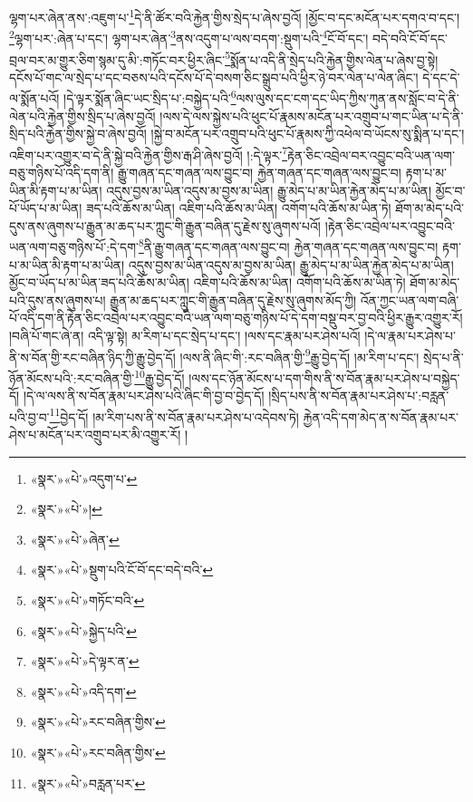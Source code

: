 ལྷག་པར་ཞེན་ནས་:འཇུག་པ་\footnote{«སྣར་»«པེ་»འདུག་པ་}དེ་ནི་ཚོར་བའི་རྐྱེན་གྱིས་སྲེད་པ་ཞེས་བྱའོ། །མྱོང་བ་དང་མངོན་པར་དགའ་བ་དང་། \footnote{«སྣར་»«པེ་»།  }ལྷག་པར་:ཞེན་པ་དང་། ལྷག་པར་ཞེན་\footnote{«སྣར་»«པེ་»ཞེན་}ནས་འདུག་པ་ལས་བདག་:སྡུག་པའི་\footnote{«སྣར་»«པེ་»སྡུག་པའི་ངོ་བོ་དང་བདེ་བའི་}ངོ་བོ་དང་། བདེ་བའི་ངོ་བོ་དང་བྲལ་བར་མ་གྱུར་ཅིག་སྙམ་དུ་མི་:གཏོང་བར་ཕྱིར་ཞིང་\footnote{«སྣར་»«པེ་»གཏོང་བའི་}སྨོན་པ་འདི་ནི་སྲེད་པའི་རྐྱེན་གྱིས་ལེན་པ་ཞེས་བྱ་སྟེ། དངོས་པོ་གང་ལ་སྲེད་པ་དང་བཅས་པའི་དངོས་པོ་དེ་བསག་ཅིང་སྒྲུབ་པའི་ཕྱིར་ཉེ་བར་ལེན་པ་ལེན་ཞིང་། དེ་དང་དེ་ལ་སྨོན་པའོ། །དེ་ལྟར་སྨོན་ཞིང་ཡང་སྲིད་པ་:བསྐྱེད་པའི་\footnote{«སྣར་»«པེ་»སྐྱེད་པའི་}ལས་ལུས་དང་ངག་དང་ཡིད་ཀྱིས་ཀུན་ནས་སློང་བ་དེ་ནི་ལེན་པའི་རྐྱེན་གྱིས་སྲིད་པ་ཞེས་བྱའོ། །ལས་དེ་ལས་སྐྱེས་པའི་ཕུང་པོ་རྣམས་མངོན་པར་འགྲུབ་པ་གང་ཡིན་པ་དེ་ནི་སྲིད་པའི་རྐྱེན་གྱིས་སྐྱེ་བ་ཞེས་བྱའོ། །སྐྱེ་བ་མངོན་པར་འགྲུབ་པའི་ཕུང་པོ་རྣམས་ཀྱི་འཕེལ་བ་ཡོངས་སུ་སྨིན་པ་དང་། འཇིག་པར་འགྱུར་བ་དེ་ནི་སྐྱེ་བའི་རྐྱེན་གྱིས་རྒ་ཤི་ཞེས་བྱའོ། །:དེ་ལྟར་\footnote{«སྣར་»«པེ་»དེ་ལྟར་ན་}རྟེན་ཅིང་འབྲེལ་བར་འབྱུང་བའི་ཡན་ལག་བཅུ་གཉིས་པོ་འདི་དག་ནི། རྒྱུ་གཞན་དང་གཞན་ལས་བྱུང་བ། རྐྱེན་གཞན་དང་གཞན་ལས་བྱུང་བ། རྟག་པ་མ་ཡིན་མི་རྟག་པ་མ་ཡིན། འདུས་བྱས་མ་ཡིན་འདུས་མ་བྱས་མ་ཡིན། རྒྱུ་མེད་པ་མ་ཡིན་རྐྱེན་མེད་པ་མ་ཡིན། མྱོང་བ་པོ་ཡོད་པ་མ་ཡིན། ཟད་པའི་ཆོས་མ་ཡིན། འཇིག་པའི་ཆོས་མ་ཡིན། འགོག་པའི་ཆོས་མ་ཡིན་ཏེ། ཐོག་མ་མེད་པའི་དུས་ནས་ཞུགས་པ་རྒྱུན་མ་ཆད་པར་ཀླུང་གི་རྒྱུན་བཞིན་དུ་རྗེས་སུ་ཞུགས་པའོ། །རྟེན་ཅིང་འབྲེལ་པར་འབྱུང་བའི་ཡན་ལག་བཅུ་གཉིས་པོ་:དེ་དག་\footnote{«སྣར་»«པེ་»འདི་དག་}ནི་རྒྱུ་གཞན་དང་གཞན་ལས་བྱུང་བ། རྐྱེན་གཞན་དང་གཞན་ལས་བྱུང་བ། རྟག་པ་མ་ཡིན་མི་རྟག་པ་མ་ཡིན། འདུས་བྱས་མ་ཡིན་འདུས་མ་བྱས་མ་ཡིན། རྒྱུ་མེད་པ་མ་ཡིན་རྐྱེན་མེད་པ་མ་ཡིན། མྱོང་བ་ཡོད་པ་མ་ཡིན་ཟད་པའི་ཆོས་མ་ཡིན། འཇིག་པའི་ཆོས་མ་ཡིན། འགོག་པའི་ཆོས་མ་ཡིན་ཏེ། ཐོག་མ་མེད་པའི་དུས་ནས་ཞུགས་པ། རྒྱུན་མ་ཆད་པར་ཀླུང་གི་རྒྱུན་བཞིན་དུ་རྗེས་སུ་ཞུགས་མོད་ཀྱི། འོན་ཀྱང་ཡན་ལག་བཞི་པོ་འདི་དག་ནི་རྟེན་ཅིང་འབྲེལ་པར་འབྱུང་བའི་ཡན་ལག་བཅུ་གཉིས་པོ་དེ་དག་བསྡུ་བར་བྱ་བའི་ཕྱིར་རྒྱུར་འགྱུར་རོ། །བཞི་པོ་གང་ཞེ་ན། འདི་ལྟ་སྟེ། མ་རིག་པ་དང་སྲེད་པ་དང་། །ལས་དང་རྣམ་པར་ཤེས་པའོ། །དེ་ལ་རྣམ་པར་ཤེས་པ་ནི་ས་བོན་གྱི་རང་བཞིན་ཉིད་ཀྱི་རྒྱུ་བྱེད་དོ། །ལས་ནི་ཞིང་གི་:རང་བཞིན་གྱི་\footnote{«སྣར་»«པེ་»རང་བཞིན་གྱིས་}རྒྱུ་བྱེད་དོ། །མ་རིག་པ་དང་། སྲེད་པ་ནི་ཉོན་མོངས་པའི་:རང་བཞིན་གྱི་\footnote{«སྣར་»«པེ་»རང་བཞིན་གྱིས་}རྒྱུ་བྱེད་དོ། །ལས་དང་ཉོན་མོངས་པ་དག་གིས་ནི་ས་བོན་རྣམ་པར་ཤེས་པ་བསྐྱེད་དོ། །དེ་ལ་ལས་ནི་ས་བོན་རྣམ་པར་ཤེས་པའི་ཞིང་གི་བྱ་བ་བྱེད་དོ། །སྲིད་པས་ནི་ས་བོན་རྣམ་པར་ཤེས་པ་:བརླན་པའི་བྱ་བ་\footnote{«སྣར་»«པེ་»བརླན་པར་}བྱེད་དོ། །མ་རིག་པས་ནི་ས་བོན་རྣམ་པར་ཤེས་པ་འདེབས་ཏེ། རྐྱེན་འདི་དག་མེད་ན་ས་བོན་རྣམ་པར་ཤེས་པ་མངོན་པར་འགྲུབ་པར་མི་འགྱུར་རོ། །
